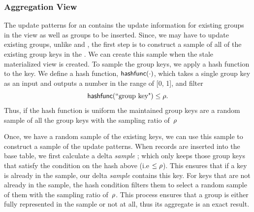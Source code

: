 \subsubsection{Aggregation View}
The update patterns for an \aggview contains the update information for existing groups in the view as well as groups to be inserted. 
Since, we may have to update existing groups, unlike \spview and \fjview, the first step is to construct a sample of all of the existing group keys in the \aggview.
We can create this sample when the stale materialized view is created.
To sample the group keys, we apply a hash function to the key. We define a hash function, $\textsf{hashfunc}(\cdot)$, which takes a single group key as an input and outputs a number in the range of [0, 1], and filter
\begin{equation}\label{eq:hash}
\textsf{hashfunc}(\textrm{``group key"}) \leq \rho .
\end{equation}
Thus, if the hash function is uniform the maintained group keys are a random sample of all the group keys with the sampling ratio of~$\rho $

Once, we have a random sample of the existing keys, we can use this sample to construct a sample of the update patterns.
When records are inserted into the base table, we first calculate a delta \emph{sample} \aggview; which only keeps those group keys that satisfy the condition on the hash above (i.e $\le \rho $). This ensures that if a key is already in the sample, our delta \emph{sample} \aggview contains this key.
For keys that are not already in the sample, the hash condition filters them to select a random sample of them with the sampling ratio of~$\rho $.
This process ensures that a group is either fully represented in the sample or not at all, thus its aggregate is an exact result.






